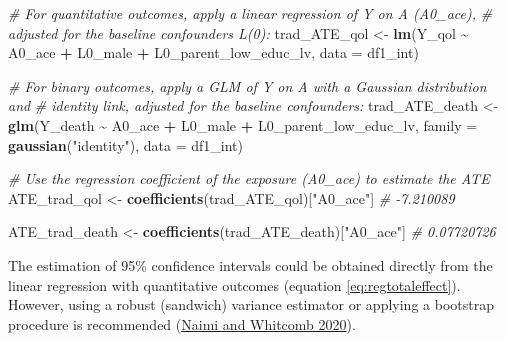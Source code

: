 \documentclass[
]{book}
\newenvironment{Shaded}{\begin{snugshade}}{\end{snugshade}}
\newcommand{\AttributeTok}[1]{\textcolor[rgb]{0.13,0.29,0.53}{#1}}
\newcommand{\CommentTok}[1]{\textcolor[rgb]{0.56,0.35,0.01}{\textit{#1}}}
\newcommand{\FunctionTok}[1]{\textcolor[rgb]{0.13,0.29,0.53}{\textbf{#1}}}
\newcommand{\NormalTok}[1]{#1}
\newcommand{\OtherTok}[1]{\textcolor[rgb]{0.56,0.35,0.01}{#1}}
\newcommand{\SpecialCharTok}[1]{\textcolor[rgb]{0.81,0.36,0.00}{\textbf{#1}}}
\newcommand{\StringTok}[1]{\textcolor[rgb]{0.31,0.60,0.02}{#1}}
\begin{document}
\begin{Shaded}
\begin{Highlighting}[]
\CommentTok{\# For quantitative outcomes, apply a linear regression of Y on A (A0\_ace), }
\CommentTok{\# adjusted for the baseline confounders L(0):}
\NormalTok{trad\_ATE\_qol }\OtherTok{\textless{}{-}} \FunctionTok{lm}\NormalTok{(Y\_qol }\SpecialCharTok{\textasciitilde{}}\NormalTok{ A0\_ace }\SpecialCharTok{+}\NormalTok{ L0\_male }\SpecialCharTok{+}\NormalTok{ L0\_parent\_low\_educ\_lv,}
                   \AttributeTok{data =}\NormalTok{ df1\_int)}

\CommentTok{\# For binary outcomes, apply a GLM of Y on A with a Gaussian distribution and}
\CommentTok{\# identity link, adjusted for the baseline confounders:}
\NormalTok{trad\_ATE\_death }\OtherTok{\textless{}{-}} \FunctionTok{glm}\NormalTok{(Y\_death }\SpecialCharTok{\textasciitilde{}}\NormalTok{ A0\_ace }\SpecialCharTok{+}\NormalTok{ L0\_male }\SpecialCharTok{+}\NormalTok{ L0\_parent\_low\_educ\_lv,}
                      \AttributeTok{family =} \FunctionTok{gaussian}\NormalTok{(}\StringTok{"identity"}\NormalTok{),}
                      \AttributeTok{data =}\NormalTok{ df1\_int)}

\CommentTok{\# Use the regression coefficient of the exposure (A0\_ace) to estimate the ATE}
\NormalTok{ATE\_trad\_qol }\OtherTok{\textless{}{-}} \FunctionTok{coefficients}\NormalTok{(trad\_ATE\_qol)[}\StringTok{"A0\_ace"}\NormalTok{]}
\CommentTok{\# {-}7.210089}

\NormalTok{ATE\_trad\_death }\OtherTok{\textless{}{-}} \FunctionTok{coefficients}\NormalTok{(trad\_ATE\_death)[}\StringTok{"A0\_ace"}\NormalTok{]}
\CommentTok{\# 0.07720726}
\end{Highlighting}
\end{Shaded}

The estimation of 95\% confidence intervals could be obtained directly from the linear regression with quantitative outcomes (equation \eqref{eq:regtotaleffect}). However, using a robust (sandwich) variance estimator or applying a bootstrap procedure is recommended (\protect\hyperlink{ref-naimi2020}{Naimi and Whitcomb 2020}).
\end{document}
